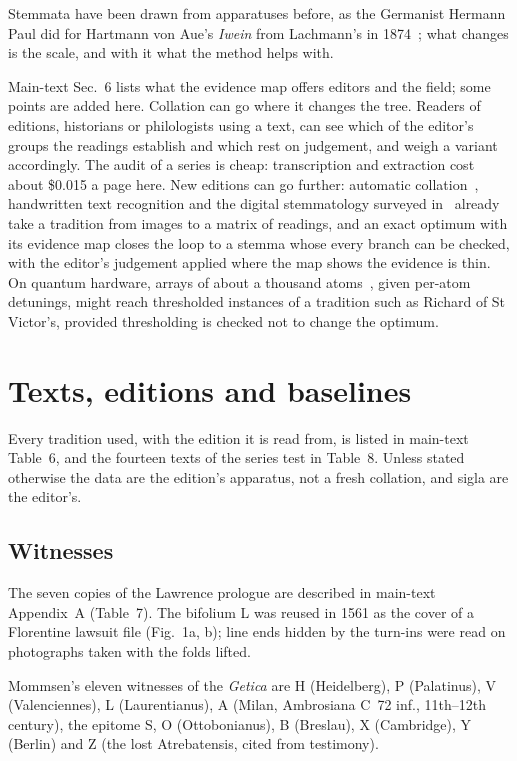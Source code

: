 \documentclass[11pt,a4paper]{article}
\theoremstyle{remark}
\begin{document}
Stemmata have been drawn from apparatuses before, as the Germanist Hermann Paul did for Hartmann von Aue's \emph{Iwein} from Lachmann's in 1874~\citep[pp.~470--471]{Roelli2020}; what changes is the scale, and with it what the method helps with.

Main-text Sec.~6 lists what the evidence map offers editors and the field; some points are added here. Collation can go where it changes the tree. Readers of editions, historians or philologists using a text, can see which of the editor's groups the readings establish and which rest on judgement, and weigh a variant accordingly. The audit of a series is cheap: transcription and extraction cost about \$0.015 a page here. New editions can go further: automatic collation~\citep{Dekker2015}, handwritten text recognition and the digital stemmatology surveyed in~\citet{Roelli2020} already take a tradition from images to a matrix of readings, and an exact optimum with its evidence map closes the loop to a stemma whose every branch can be checked, with the editor's judgement applied where the map shows the evidence is thin. On quantum hardware, arrays of about a thousand atoms~\citep{Lim2026}, given per-atom detunings, might reach thresholded instances of a tradition such as Richard of St Victor's, provided thresholding is checked not to change the optimum.

\section{Texts, editions and baselines}
\label{app:texts}
Every tradition used, with the edition it is read from, is listed in main-text Table~6, and the fourteen texts of the series test in Table~8. Unless stated otherwise the data are the edition's apparatus, not a fresh collation, and sigla are the editor's.

\subsection{Witnesses}
The seven copies of the Lawrence prologue are described in main-text Appendix~A (Table~7). The bifolium L was reused in 1561 as the cover of a Florentine lawsuit file (Fig.~1a, b); line ends hidden by the turn-ins were read on photographs taken with the folds lifted.

Mommsen's eleven witnesses of the \emph{Getica} are H (Heidelberg), P (Palatinus), V (Valenciennes), L (Laurentianus), A (Milan, Ambrosiana C~72 inf., 11th--12th century), the epitome S, O (Ottobonianus), B (Breslau), X (Cambridge), Y (Berlin) and Z (the lost Atrebatensis, cited from testimony).
\end{document}
